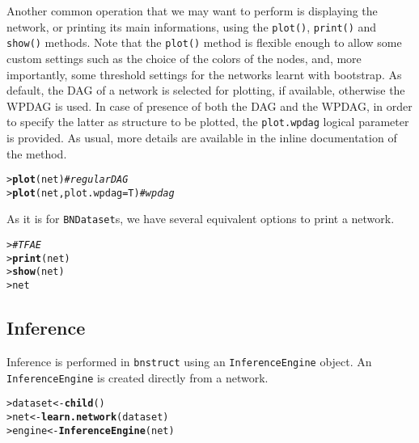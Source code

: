 \documentclass{article}\usepackage[]{graphicx}\usepackage[]{color}
\makeatletter
\newcommand{\hlcom}[1]{\textcolor[rgb]{0.678,0.584,0.686}{\textit{#1}}}%
\newcommand{\hlstd}[1]{\textcolor[rgb]{0.345,0.345,0.345}{#1}}%
\newcommand{\hlkwb}[1]{\textcolor[rgb]{0.69,0.353,0.396}{#1}}%
\newcommand{\hlkwc}[1]{\textcolor[rgb]{0.333,0.667,0.333}{#1}}%
\newcommand{\hlkwd}[1]{\textcolor[rgb]{0.737,0.353,0.396}{\textbf{#1}}}%
\newenvironment{kframe}{%
 \def\at@end@of@kframe{}%
 \ifinner\ifhmode%
  \def\at@end@of@kframe{\end{minipage}}%
  \begin{minipage}{\columnwidth}%
 \fi\fi%
 \def\FrameCommand##1{\hskip\@totalleftmargin \hskip-\fboxsep
 \colorbox{shadecolor}{##1}\hskip-\fboxsep
     \hskip-\linewidth \hskip-\@totalleftmargin \hskip\columnwidth}%
 \MakeFramed {\advance\hsize-\width
   \@totalleftmargin\z@ \linewidth\hsize
   \@setminipage}}%
 {\par\unskip\endMakeFramed%
 \at@end@of@kframe}
\newenvironment{knitrout}{}{} %
\newcommand{\Robject}[1]{{\texttt{#1}}}
\newcommand{\Rpackage}[1]{{\texttt{#1}}}
\newcommand{\Rmethod}[1]{{\texttt{#1}}}
\newcommand{\Rfunarg}[1]{{\texttt{#1}}}
\makeatother
\begin{document}
Another common operation that we may want to perform is displaying the network, or printing its main informations, using the
\Rmethod{plot()}, \Rmethod{print()} and \Rmethod{show()} methods. Note that the \Rmethod{plot()} method is flexible enough to allow 
some custom settings such as the choice of the colors of the nodes, and, more importantly, some threshold settings 
for the networks learnt with bootstrap. As default, the DAG of a network is selected for plotting, if available,
otherwise the WPDAG is used. In case of presence of both the DAG and the WPDAG, in order to specify the latter as
structure to be plotted, the \Rfunarg{plot.wpdag} logical parameter is provided. As usual, more details are available
in the inline documentation of the method.
\begin{knitrout}
\color{fgcolor}\begin{kframe}
\begin{alltt}
\hlstd{> }\hlkwd{plot}\hlstd{(net)} \hlcom{# regular DAG}
\hlstd{> }\hlkwd{plot}\hlstd{(net,} \hlkwc{plot.wpdag}\hlstd{=T)} \hlcom{# wpdag}
\end{alltt}
\end{kframe}
\end{knitrout}

As it is for \Robject{BNDataset}s, we have several equivalent options to print a network.
\begin{knitrout}
\color{fgcolor}\begin{kframe}
\begin{alltt}
\hlstd{> }\hlcom{# TFAE}
\hlstd{> }\hlkwd{print}\hlstd{(net)}
\hlstd{> }\hlkwd{show}\hlstd{(net)}
\hlstd{> }\hlstd{net}
\end{alltt}
\end{kframe}
\end{knitrout}

\subsection{Inference}\label{sec:infengine}
Inference is performed in \Rpackage{bnstruct} using an \Robject{InferenceEngine} object. An \Robject{InferenceEngine}
is created directly from a network.
\begin{knitrout}
\color{fgcolor}\begin{kframe}
\begin{alltt}
\hlstd{> }\hlstd{dataset} \hlkwb{<-} \hlkwd{child}\hlstd{()}
\hlstd{> }\hlstd{net}     \hlkwb{<-} \hlkwd{learn.network}\hlstd{(dataset)}
\hlstd{> }\hlstd{engine}  \hlkwb{<-} \hlkwd{InferenceEngine}\hlstd{(net)}
\end{alltt}
\end{kframe}
\end{knitrout}
\end{document}
